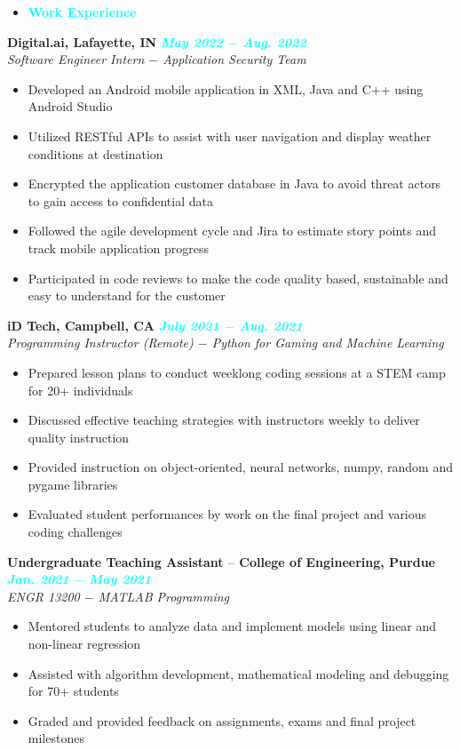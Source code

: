 \documentclass{article}
\begin{document}
\begin{itemize}[noitemsep, nolistsep, leftmargin = *]
    \item[\textcolor{cyan}{\ding{228}}]\Large{\textcolor{cyan}{\textbf{Work Experience}}}
    \hrulefill
\end{itemize}
\textbf{Digital.ai, Lafayette, IN} \hfill \textit{\textcolor{cyan}{\textbf{May 2022 $-$ Aug. 2022}}} \\
\textit{Software Engineer Intern $-$ Application Security Team} 
\begin{itemize}[noitemsep, nolistsep]
    \item Developed an Android mobile application in XML, Java and C++ using Android Studio 
    \item Utilized RESTful APIs to assist with user navigation and display weather conditions at destination
    \item Encrypted the application customer database in Java to avoid threat actors to gain access to confidential data
    \item Followed the agile development cycle and Jira to estimate story points and track mobile application progress
    \item Participated in code reviews to make the code quality based, sustainable and easy to understand for the customer \\
\end{itemize}
\textbf{iD Tech, Campbell, CA} \hfill \textit{\textcolor{cyan}{\textbf{July 2021 $-$ Aug. 2021}}} \\
\textit{Programming Instructor (Remote) $-$ Python for Gaming and Machine Learning}
\begin{itemize}[noitemsep, nolistsep]
    \item Prepared lesson plans to conduct weeklong coding sessions at a STEM camp for 20+ individuals
    \item Discussed effective teaching strategies with instructors weekly to deliver quality instruction
    \item Provided instruction on object-oriented, neural networks, numpy, random and pygame libraries
    \item Evaluated student performances by work on the final project and various coding challenges \\
\end{itemize}
\textbf{Undergraduate Teaching Assistant $–$ College of Engineering, Purdue} \hfill \textit{\textcolor{cyan}{\textbf{Jan. 2021 $-$ May 2021}}} \\
\textit{ENGR 13200 $-$ MATLAB Programming}
\begin{itemize}[noitemsep, nolistsep]
    \item Mentored students to analyze data and implement models using linear and non-linear regression
    \item Assisted with algorithm development, mathematical modeling and debugging for 70+ students
    \item Graded and provided feedback on assignments, exams and final project milestones \\
\end{itemize}
\end{document}
